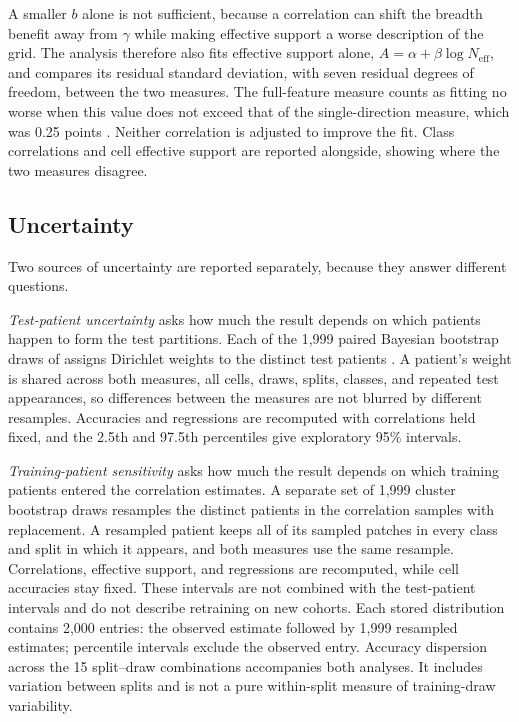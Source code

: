 \documentclass[11pt]{article}
\newcommand{\Neff}{N_{\mathrm{eff}}}
\begin{document}
A smaller $b$ alone is not sufficient, because a correlation can shift the breadth benefit away from $\gamma$ while making effective support a worse description of the grid. The analysis therefore also fits effective support alone, $A=\alpha+\beta\log\Neff$, and compares its residual standard deviation, with seven residual degrees of freedom, between the two measures. The full-feature measure counts as fitting no worse when this value does not exceed that of the single-direction measure, which was 0.25 points \citep{queisler2026effectiveSupport}. Neither correlation is adjusted to improve the fit. Class correlations and cell effective support are reported alongside, showing where the two measures disagree.

\subsection{Uncertainty}
\label{sec:uncertainty}
Two sources of uncertainty are reported separately, because they answer different questions.

\emph{Test-patient uncertainty} asks how much the result depends on which patients happen to form the test partitions. Each of the 1,999 paired Bayesian bootstrap draws of \citet{queisler2026effectiveSupport} assigns Dirichlet weights to the distinct test patients \citep{rubin1981bayesian}. A patient's weight is shared across both measures, all cells, draws, splits, classes, and repeated test appearances, so differences between the measures are not blurred by different resamples. Accuracies and regressions are recomputed with correlations held fixed, and the 2.5th and 97.5th percentiles give exploratory 95\% intervals.

\emph{Training-patient sensitivity} asks how much the result depends on which training patients entered the correlation estimates. A separate set of 1,999 cluster bootstrap draws resamples the distinct patients in the correlation samples with replacement. A resampled patient keeps all of its sampled patches in every class and split in which it appears, and both measures use the same resample. Correlations, effective support, and regressions are recomputed, while cell accuracies stay fixed. These intervals are not combined with the test-patient intervals and do not describe retraining on new cohorts. Each stored distribution contains 2,000 entries: the observed estimate followed by 1,999 resampled estimates; percentile intervals exclude the observed entry. Accuracy dispersion across the 15 split--draw combinations accompanies both analyses. It includes variation between splits and is not a pure within-split measure of training-draw variability.
\end{document}
